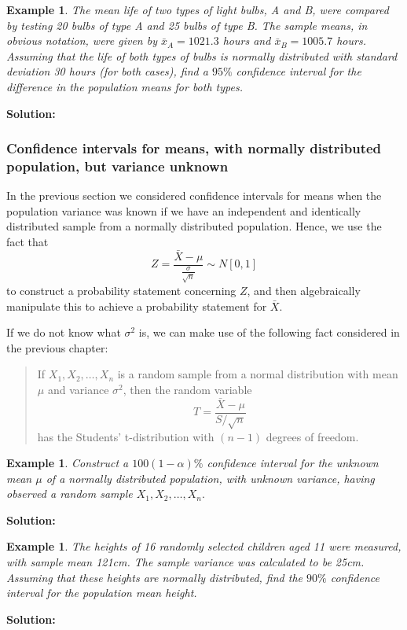 \documentclass[12pt]{article}
\newtheorem{example}[theorem]{Example}
\begin{document}
\begin{example}
The mean life of two types of light bulbs, A and B, were compared by testing 20 bulbs of type A and 25 bulbs of type B. The sample means, in obvious notation, were given by $\bar{x}_{A}=1021.3$ hours and $\bar{x}_{B}=1005.7$ hours. Assuming that the life of both types of bulbs is normally distributed with standard deviation 30 hours (for both cases), find a $95\%$ confidence interval for the difference in the population means for both types.
\end{example}
\begin{mdframed}
{\bf Solution:}
\textcolor[rgb]{1.00,1.00,1.00}{\lipsum[1-4]}
\end{mdframed}

\subsubsection{Confidence intervals for means, with normally distributed population, but variance unknown}
In the previous section we considered confidence intervals for means when the population variance was known if we have an independent and identically distributed sample from a normally distributed population. Hence, we use the fact that $$Z=\frac{\bar{X}-\mu}{\frac{\sigma}{\sqrt{n}}}\sim N[0,1]$$
to construct a probability statement concerning $Z$, and then algebraically manipulate this to achieve a probability statement for $\bar{X}$.

If we do not know what $\sigma^{2}$ is, we can make use of the following fact considered in the previous chapter:
\begin{quote}
If $X_{1},X_{2},\ldots,X_{n}$ is a random sample from a normal distribution with mean $\mu$ and variance $\sigma^2$, then the random variable $$ T=\frac{\bar{X}-\mu}{S/\sqrt{n}}$$ has the Students' t-distribution with $(n-1)$ degrees of freedom.
\end{quote}

\begin{example}
Construct a $100(1-\alpha)\%$ confidence interval for the unknown mean $\mu$ of a normally distributed population, with unknown variance, having observed a random sample $X_{1},X_{2},\ldots, X_{n}.$
\end{example}
\begin{mdframed}
{\bf Solution:}
\textcolor[rgb]{1.00,1.00,1.00}{\lipsum[1-8]}
\end{mdframed}

\begin{example}
The heights of 16 randomly selected children aged 11 were measured, with sample mean 121cm. The sample variance was calculated to be 25cm. Assuming that these heights are normally distributed, find the $90\%$ confidence interval for the population mean height.
\end{example}
\begin{mdframed}
{\bf Solution:}
\textcolor[rgb]{1.00,1.00,1.00}{\lipsum[1-2]}
\end{mdframed}
\end{document}
